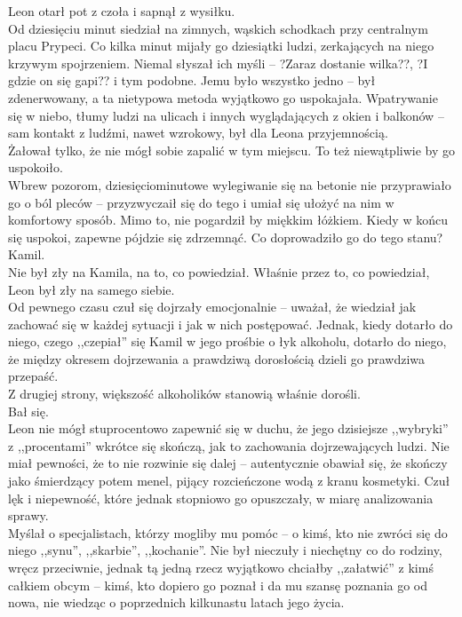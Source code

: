 \documentclass[../MAIN.tex]{subfiles}
\begin{document}
Leon otarł pot z czoła i sapnął z wysiłku.\\
Od dziesięciu minut siedział na zimnych, wąskich schodkach przy centralnym placu Prypeci. Co kilka minut mijały go dziesiątki ludzi, zerkających na niego krzywym spojrzeniem. Niemal słyszał ich myśli -- ?Zaraz dostanie wilka??, ?I gdzie on się gapi?? i tym podobne. Jemu było wszystko jedno -- był zdenerwowany, a ta nietypowa metoda wyjątkowo go uspokajała. Wpatrywanie się w niebo, tłumy ludzi na ulicach i innych wyglądających z okien i balkonów -- sam kontakt z ludźmi, nawet wzrokowy, był dla Leona przyjemnością.\\
Żałował tylko, że nie mógł sobie zapalić w tym miejscu. To też niewątpliwie by go uspokoiło.\\
Wbrew pozorom, dziesięciominutowe wylegiwanie się na betonie nie przyprawiało go o ból pleców -- przyzwyczaił się do tego i umiał się ułożyć na nim w komfortowy sposób. Mimo to, nie pogardził by miękkim łóżkiem. Kiedy w końcu się uspokoi, zapewne pójdzie się zdrzemnąć. Co doprowadziło go do tego stanu?\\
Kamil.\\
Nie był zły na Kamila, na to, co powiedział. Właśnie przez to, co powiedział, Leon był zły na samego siebie.\\
Od pewnego czasu czuł się dojrzały emocjonalnie -- uważał, że wiedział jak zachować się w każdej sytuacji i jak w nich postępować. Jednak, kiedy dotarło do niego, czego ,,czepiał'' się Kamil w jego prośbie o łyk alkoholu, dotarło do niego, że między okresem dojrzewania a prawdziwą dorosłością dzieli go prawdziwa przepaść.\\
Z drugiej strony, większość alkoholików stanowią właśnie dorośli.\\
Bał się.\\
Leon nie mógł stuprocentowo zapewnić się w duchu, że jego dzisiejsze ,,wybryki'' z ,,procentami'' wkrótce się skończą, jak to zachowania dojrzewających ludzi. Nie miał pewności, że to nie rozwinie się dalej -- autentycznie obawiał się, że skończy jako śmierdzący potem menel, pijący rozcieńczone wodą z kranu kosmetyki. Czuł lęk i niepewność, które jednak stopniowo go opuszczały, w miarę analizowania sprawy.\\
Myślał o specjalistach, którzy mogliby mu pomóc -- o kimś, kto nie zwróci się do niego ,,synu'', ,,skarbie'', ,,kochanie''. Nie był nieczuły i niechętny co do rodziny, wręcz przeciwnie, jednak tą jedną rzecz wyjątkowo chciałby ,,załatwić'' z kimś całkiem obcym -- kimś, kto dopiero go poznał i da mu szansę poznania go od nowa, nie wiedząc o poprzednich kilkunastu latach jego życia.\\
\end{document}
